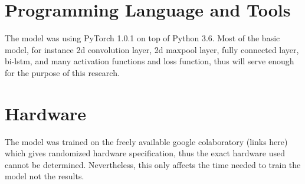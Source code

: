 \section{Programming Language and Tools}
    The model was using PyTorch 1.0.1
    \cite{pytorch2017paszke} on top of Python 3.6. Most of the
    basic model, for instance 2d convolution layer, 2d maxpool
    layer, fully connected layer, bi-lstm, and many activation
    functions and loss function, thus will serve enough for the
    purpose of this research.
        
\section{Hardware}
    The model was trained on the freely available google colaboratory
    (links here) which gives randomized hardware specification, thus
    the exact hardware used cannot be determined. Nevertheless, this
    only affects the time needed to train the model not the results.